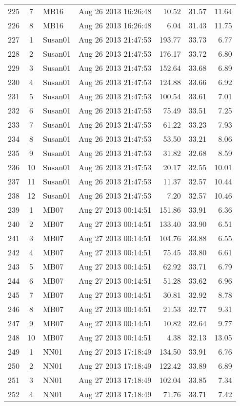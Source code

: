 \documentclass{article}
\begin{document}
\begin{longtable}{ccllrrr}
225&7&MB16&Aug 26 2013 16:26:48&10.52&31.57&11.64\\
226&8&MB16&Aug 26 2013 16:26:48&6.04&31.43&11.75\\
\hline 
227&1&Susan01&Aug 26 2013 21:47:53&193.77&33.73&6.77\\
228&2&Susan01&Aug 26 2013 21:47:53&176.17&33.72&6.80\\
229&3&Susan01&Aug 26 2013 21:47:53&152.64&33.68&6.89\\
230&4&Susan01&Aug 26 2013 21:47:53&124.88&33.66&6.92\\
231&5&Susan01&Aug 26 2013 21:47:53&100.54&33.61&7.01\\
232&6&Susan01&Aug 26 2013 21:47:53&75.49&33.51&7.25\\
233&7&Susan01&Aug 26 2013 21:47:53&61.22&33.23&7.93\\
234&8&Susan01&Aug 26 2013 21:47:53&53.50&33.21&8.06\\
235&9&Susan01&Aug 26 2013 21:47:53&31.82&32.68&8.59\\
236&10&Susan01&Aug 26 2013 21:47:53&20.17&32.55&10.01\\
237&11&Susan01&Aug 26 2013 21:47:53&11.37&32.57&10.44\\
238&12&Susan01&Aug 26 2013 21:47:53&7.20&32.57&10.46\\
\hline 
239&1&MB07&Aug 27 2013 00:14:51&151.86&33.91&6.36\\
240&2&MB07&Aug 27 2013 00:14:51&133.40&33.90&6.51\\
241&3&MB07&Aug 27 2013 00:14:51&104.76&33.88&6.55\\
242&4&MB07&Aug 27 2013 00:14:51&75.45&33.80&6.61\\
243&5&MB07&Aug 27 2013 00:14:51&62.92&33.71&6.79\\
244&6&MB07&Aug 27 2013 00:14:51&51.28&33.62&6.96\\
245&7&MB07&Aug 27 2013 00:14:51&30.81&32.92&8.78\\
246&8&MB07&Aug 27 2013 00:14:51&21.53&32.77&9.31\\
247&9&MB07&Aug 27 2013 00:14:51&10.82&32.64&9.77\\
248&10&MB07&Aug 27 2013 00:14:51&4.38&32.13&13.05\\
\hline 
249&1&NN01&Aug 27 2013 17:18:49&134.50&33.91&6.76\\
250&2&NN01&Aug 27 2013 17:18:49&122.42&33.89&6.89\\
251&3&NN01&Aug 27 2013 17:18:49&102.04&33.85&7.34\\
252&4&NN01&Aug 27 2013 17:18:49&71.76&33.71&7.42\\

\end{longtable}
\end{document}
